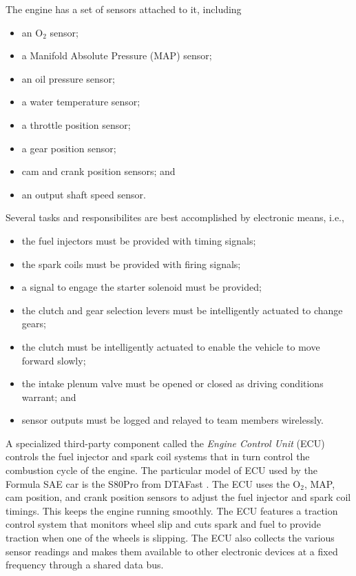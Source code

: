 The engine has a set of sensors attached to it, including

\begin{itemize}
\item an O$_{2}$ sensor;
\item a Manifold Absolute Pressure (MAP) sensor; 
\item an oil pressure sensor;
\item a water temperature sensor;
\item a throttle position sensor;
\item a gear position sensor;
\item cam and crank position sensors; and
\item an output shaft speed sensor.
\end{itemize}

Several tasks and responsibilites are best accomplished by electronic means, i.e.,

\begin{itemize}
\item the fuel injectors must be provided with timing signals;
\item the spark coils must be provided with firing signals;
\item a signal to engage the starter solenoid must be provided;
\item the clutch and gear selection levers must be intelligently actuated to change gears; 
\item the clutch must be intelligently actuated to enable the vehicle to move forward slowly;
\item the intake plenum valve must be opened or closed as driving conditions warrant; and
\item sensor outputs must be logged and relayed to team members wirelessly.
\end{itemize}

A specialized third-party component called the \emph{Engine Control Unit} (ECU) controls the fuel injector and spark coil systems that in turn control the combustion cycle of the engine. The particular model of ECU used by the Formula SAE car is the S80Pro from DTAFast \cite{s60pro}. The ECU uses the O$_{2}$, MAP, cam position, and crank position sensors to adjust the fuel injector and spark coil timings. This keeps the engine running smoothly. The ECU features a traction control system that monitors wheel slip and cuts spark and fuel to provide traction when one of the wheels is slipping. The ECU also collects the various sensor readings and makes them available to other electronic devices at a fixed frequency through a shared data bus. 

